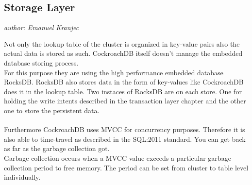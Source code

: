\subsection{Storage Layer}
\emph{author: Emanuel Kranjec}\bigskip

Not only the lookup table of the cluster is organized in key-value pairs also the actual data is stored as such. CockroachDB
itself doesn't manage the embedded database storing process.\\
For this purpose they are using the high performance embedded database RocksDB. RocksDB also stores data in the form of 
key-values like CockroachDB does it in the lookup table. Two instaces of RocksDB are on each store. One for holding the write 
intents described in the transaction layer chapter and the other one to store the 
persistent data.\\\\
Furthermore CockroachDB uses MVCC for concurrency purposes. Therefore it is also able to time-travel as described in the SQL:2011 
standard. You can get back as far as the garbage collection got.\\
Garbage collection occurs when a MVCC value exceeds a particular garbage collection period to free memory. The period can be set
from cluster to table level individually.